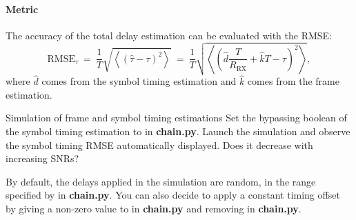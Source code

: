 \paragraph{Metric} The accuracy of the total delay estimation can be evaluated with the RMSE:
\begin{equation*}
    \text{RMSE}_{\tau}\:=\:\frac{1}{T}\sqrt{\left\langle\left(\hat{\tau}-\tau\right)^2\right\rangle}\:=\:\frac{1}{T}\sqrt{\left\langle\left(\hat{d}\frac{T}{R_{\text{RX}}}+\hat{k}T-\tau\right)^2\right\rangle},
\end{equation*}
where $\hat{d}$ comes from the symbol timing estimation and $\hat{k}$ comes from the frame estimation.



\begin{bclogo}[couleur = gray!20, arrondi = 0.2, logo=\bccrayon]{Simulation of frame and symbol timing estimations}
Set the bypassing boolean of the symbol timing estimation to  in \textbf{chain.py}. Launch the simulation and observe the symbol timing RMSE automatically displayed. Does it decrease with increasing SNRs?

By default, the delays applied in the simulation are random, in the range specified by  in \textbf{chain.py}. You can also decide to apply a constant timing offset by giving a non-zero value to  in \textbf{chain.py} and removing  in \textbf{chain.py}.

\end{bclogo}
